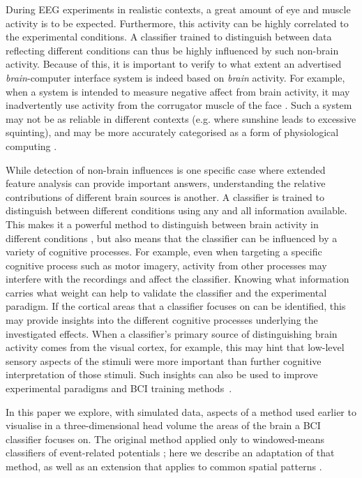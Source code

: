 During EEG experiments in realistic contexts, a great amount of eye and muscle activity is to be expected. Furthermore, this activity can be highly correlated to the experimental conditions. A classifier trained to distinguish between data reflecting different conditions can thus be highly influenced by such non-brain activity. Because of this, it is important to verify to what extent an advertised \emph{brain}-computer interface system is indeed based on \emph{brain} activity. For example, when a system is intended to measure negative affect from brain activity, it may inadvertently use activity from the corrugator muscle of the face \cite{larsen2003emgaffect}. Such a system may not be as reliable in different contexts (e.g. where sunshine leads to excessive squinting), and may be more accurately categorised as a form of physiological computing \cite{fairclough2009fundamentals}.

While detection of non-brain influences is one specific case where extended feature analysis can provide important answers, 
understanding the relative contributions of different brain sources is another.
A classifier is trained to distinguish between different conditions using any and all 
information available. This makes it a powerful method to distinguish between brain activity in different conditions \cite{noh2014dimred},
but also means that the classifier
can be influenced by a variety of cognitive processes.  
For example,
even when targeting a specific cognitive process such as motor imagery, activity from other processes may interfere with the recordings \cite{mousavi2017mi} and affect the classifier. 
Knowing what information carries what weight can help to validate the classifier and the experimental paradigm.  If the cortical areas that a classifier focuses on can be
identified, this may 
provide insights into the different cognitive processes underlying the investigated effects. 
When a classifier's primary source of distinguishing brain activity comes from the visual cortex, for example, this may hint that low-level sensory aspects of the stimuli were more important than further cognitive interpretation of those stimuli. 
Such insights can also be used to improve experimental paradigms and BCI training methods~\cite{mousavi2017training}.

In this paper we explore, with simulated data, aspects of a method used earlier \cite{zander2016nat} to visualise in a three-dimensional head volume the areas of the brain a BCI classifier focuses on. The original method applied only to windowed-means classifiers of event-related potentials \cite{blankertz2011}; here we describe an adaptation of that method, as well as an extension that applies to common spatial patterns \cite{ramoser2000}. 


